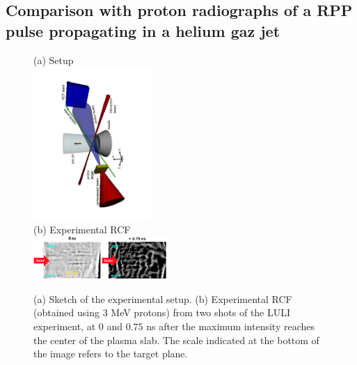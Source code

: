 \documentclass[
 reprint,
 amsmath,amssymb,
 aps,
]{revtex4-1}
\begin{document}
\subsection{Comparison with proton radiographs of a RPP pulse propagating in a helium gaz jet}\label{sec:xp}
\begin{figure}
(a) Setup \\
\includegraphics[width=0.4\textwidth,angle=-90]{set_up.pdf}\\
(b) Experimental RCF \\
\includegraphics[width=0.45\textwidth]{rcf.png}
\caption{ \label{fig:xpfuchs_xp}  
(a) Sketch of the experimental setup.
(b) Experimental RCF (obtained using 3 MeV protons) from two shots of the LULI experiment, at $0$ and $0.75$ ns after the maximum intensity reaches the center of the plasma slab.  The scale indicated at the bottom of the image refers to the target plane. 
 }
\end{figure}
\end{document}
